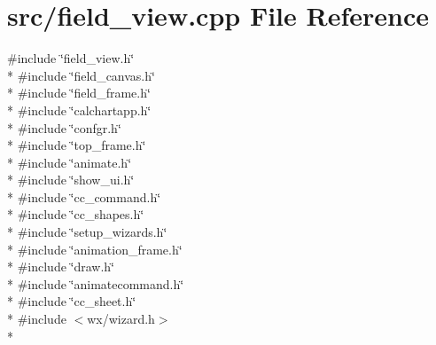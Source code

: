 \hypertarget{a00228}{\section{src/field\-\_\-view.cpp File Reference}
\label{a00228}
}
{\ttfamily \#include \char`\"{}field\-\_\-view.\-h\char`\"{}}\\*
{\ttfamily \#include \char`\"{}field\-\_\-canvas.\-h\char`\"{}}\\*
{\ttfamily \#include \char`\"{}field\-\_\-frame.\-h\char`\"{}}\\*
{\ttfamily \#include \char`\"{}calchartapp.\-h\char`\"{}}\\*
{\ttfamily \#include \char`\"{}confgr.\-h\char`\"{}}\\*
{\ttfamily \#include \char`\"{}top\-\_\-frame.\-h\char`\"{}}\\*
{\ttfamily \#include \char`\"{}animate.\-h\char`\"{}}\\*
{\ttfamily \#include \char`\"{}show\-\_\-ui.\-h\char`\"{}}\\*
{\ttfamily \#include \char`\"{}cc\-\_\-command.\-h\char`\"{}}\\*
{\ttfamily \#include \char`\"{}cc\-\_\-shapes.\-h\char`\"{}}\\*
{\ttfamily \#include \char`\"{}setup\-\_\-wizards.\-h\char`\"{}}\\*
{\ttfamily \#include \char`\"{}animation\-\_\-frame.\-h\char`\"{}}\\*
{\ttfamily \#include \char`\"{}draw.\-h\char`\"{}}\\*
{\ttfamily \#include \char`\"{}animatecommand.\-h\char`\"{}}\\*
{\ttfamily \#include \char`\"{}cc\-\_\-sheet.\-h\char`\"{}}\\*
{\ttfamily \#include $<$wx/wizard.\-h$>$}\\*
